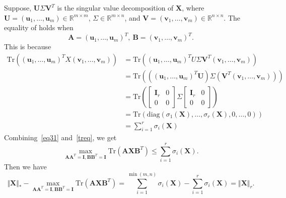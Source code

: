 \documentclass{article}
\begin{document}
{Suppose, $\mathbf U\mathbf \varSigma\mathbf V^T$ is the singular value decomposition of $\mathbf X$, where $\mathbf U = (\mathbf u_1,\dots,\mathbf u_m) \in \mathbb{R}^{m \times m}$, $\mathbf \varSigma \in \mathbb{R}^{m \times n}$, and $\mathbf V = (\mathbf v_1,\dots,\mathbf v_m) \in \mathbb{R}^{n \times n}$. The equality of holds when 
\begin{equation}
    \mathbf A = (\mathbf u_1,\dots,\mathbf u_m)^T, \ \mathbf B = (\mathbf v_1,\dots,\mathbf v_m)^T.
    \label{}
\end{equation}
This is because
\begin{equation}
    \begin{aligned}
        \text{Tr} ((\mathbf u_1,\dots,\mathbf u_m)^TX(\mathbf v_1,\dots,\mathbf v_m))
        & = \text{Tr} ((\mathbf u_1,\dots,\mathbf u_m)^TU\mathbf \varSigma\mathbf V^T(\mathbf v_1,\dots,\mathbf v_m)) \\
        & = \text{Tr} (((\mathbf u_1,\dots,\mathbf u_m)^T\mathbf U) \mathbf \varSigma (\mathbf V^T(\mathbf v_1,\dots,\mathbf v_m))) \\
        & = \text{Tr} \left( \begin{bmatrix}
            \mathbf I_r & 0\\
            0 & 0 
        \end{bmatrix} \Sigma \begin{bmatrix}
            \mathbf I_r & 0\\
            0 & 0 
        \end{bmatrix}
        \right) \\
        & = \text{Tr}(\text{diag}(\sigma_1(\mathbf X),\dots,\sigma_r(\mathbf X),0,\dots,0)) \\
        & = \sum_{i=1}^r \sigma_i(\mathbf X)	
    \end{aligned}
    \label{treq}
\end{equation}
Combining~\eqref{eq31} and~\eqref{treq}, we get
\begin{equation}
    \underset{\mathbf A\mathbf A^T=\mathbf I,\mathbf B\mathbf B^T=\mathbf I}{\max} \text{Tr}(\mathbf A\mathbf X\mathbf B^T) \leq \sum_{i=1}^r \sigma_i(\mathbf X).
\end{equation}
Then we have 
\begin{equation}
    \Vert\mathbf X \Vert_* - \underset{\mathbf A\mathbf A^T=\mathbf I,\mathbf B\mathbf B^T=\mathbf I}{\max} \text{Tr}(\mathbf A\mathbf X\mathbf B^T)  
        = \sum_{i=1}^{\min(m,n)} \sigma_i(\mathbf X) - \sum_{i=1}^r \sigma_i(\mathbf X) 
        = \Vert\mathbf X \Vert_r.

\end{equation}}
\end{document}

